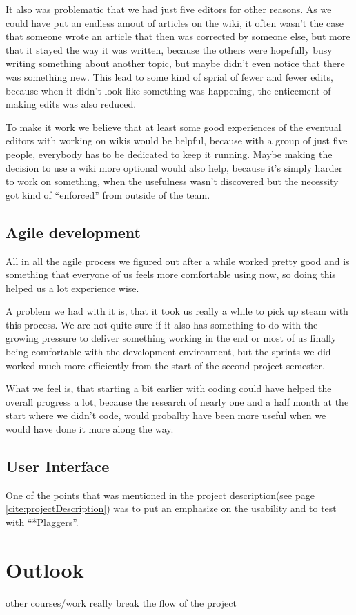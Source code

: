 It also was problematic that we had just five editors for other reasons. As we could have put an endless amout of articles on the wiki, it often wasn't the case that someone wrote an article that then was corrected by someone else, but more that it stayed the way it was written, because the others were hopefully busy writing something about another topic, but maybe didn't even notice that there was something new. This lead to some kind of sprial of fewer and fewer edits, because when it didn't look like something was happening, the enticement of making edits was also reduced.

To make it work we believe that at least some good experiences of the eventual editors with working on wikis would be helpful, because with a group of just five people, everybody has to be dedicated to keep it running. Maybe making the decision to use a wiki more optional would also help, because it's simply harder to work on something, when the usefulness wasn't discovered but the necessity got kind of \enquote{enforced} from outside of the team.


\subsection{Agile development}

All in all the agile process we figured out after a while worked pretty good and is something that everyone of us feels more comfortable using now, so doing this helped us a lot experience wise. 

A problem we had with it is, that it took us really a while to pick up steam with this process. We are not quite sure if it also has something to do with the growing pressure to deliver something working in the end or most of us finally being comfortable with the development environment, but the sprints we did worked much more efficiently from the start of the second project semester.

What we feel is, that starting a bit earlier with coding could have helped the overall progress a lot, because the research of nearly one and a half month at the start where we didn't code, would probalby have been more useful when we would have done it more along the way.

\subsection{User Interface}

One of the points that was mentioned in the project description(see page \ref{cite:projectDescription}) was to put an emphasize on the usability and to test with \enquote{*Plaggers}.


\section{Outlook}

other courses/work really break the flow of the project